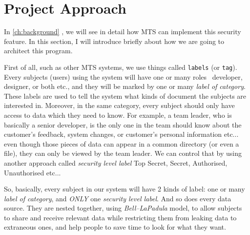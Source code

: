 \section{Project Approach}
In \autoref{ch:background} , we will see in detail how MTS can implement this security feature.
In this section, I will introduce briefly about how we are going to architect this program.

First of all, such as other MTS systems, we use things called \texttt{labels} (or \texttt{tag}).
Every subjects (\ie users) using the system will have one or many roles \eg\, developer, designer, or both etc., and they will be marked by one or many \emph{label of category}.
These labels are used to tell the system what kinds of document the subjects are interested in.
Moreover, in the same category, every subject should only have access to data which they need to know.
For example, a team leader, who is basically a senior developer, is the only one in the team should know about the customer's feedback, system changes, or customer's personal information etc...
even though those pieces of data can appear in a common directory (or even a file), they can only be viewed by the team leader.
We can control that by using another approach called \emph{security level label} \eg Top Secret, Secret, Authorised, Unauthorised etc...

So, basically, every subject in our system will have 2 kinds of label:
one or many \emph{label of category}, 
and \emph{ONLY} one \emph{security level label}.
And so does every data source.
They are nested together, using \emph{Bell--LaPadula} model,
to allow subjects to share and receive relevant data while restricting them from leaking data to extraneous ones,
and help people to save time to look for what they want.
